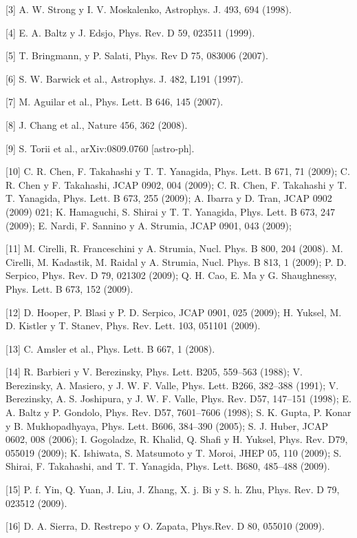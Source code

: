 [3] A. W. Strong y I. V. Moskalenko, Astrophys. J. 493, 694 (1998).

[4] E. A. Baltz y J. Edsjo, Phys. Rev. D 59, 023511 (1999).

[5] T. Bringmann, y P. Salati, Phys. Rev D 75, 083006 (2007).

[6] S. W. Barwick et al., Astrophys. J. 482, L191 (1997).

[7] M. Aguilar et al., Phys. Lett. B 646, 145 (2007).

[8] J. Chang et al., Nature 456, 362 (2008).

[9] S. Torii et al., arXiv:0809.0760 [astro-ph].

[10] C. R. Chen, F. Takahashi y T. T. Yanagida, Phys. Lett. B 671, 71 (2009); C. R. Chen y F. Takahashi, JCAP 0902, 004 (2009); 
C. R. Chen, F. Takahashi y T. T. Yanagida, Phys. Lett. B 673, 255 (2009); A. Ibarra y D. Tran, JCAP 0902 (2009) 021; 
K. Hamaguchi, S. Shirai y T. T. Yanagida, Phys. Lett. B 673, 247 (2009); E. Nardi, F. Sannino y A. Strumia, JCAP 0901, 043 (2009);

[11] M. Cirelli, R. Franceschini y A. Strumia, Nucl. Phys. B 800, 204 (2008). M. Cirelli, M. Kadastik, M. Raidal y A. Strumia, 
Nucl. Phys. B 813, 1 (2009); P. D. Serpico, Phys. Rev. D 79, 021302 (2009); Q. H. Cao, E. Ma y G. Shaughnessy, 
Phys. Lett. B 673, 152 (2009).

[12] D. Hooper, P. Blasi y P. D. Serpico, JCAP 0901, 025 (2009); H. Yuksel, M. D. Kistler y T. Stanev,
 Phys. Rev. Lett. 103, 051101 (2009).

[13] C. Amsler et al., Phys. Lett. B 667, 1 (2008).

[14] R. Barbieri y V. Berezinsky, Phys. Lett. B205, 559–563 (1988); V. Berezinsky, A. Masiero, y J. W. F. Valle, 
Phys. Lett. B266, 382–388 (1991); V. Berezinsky, A. S. Joshipura, y J. W. F. Valle, Phys. Rev. D57, 147–151 (1998); 
E. A. Baltz y P. Gondolo, Phys. Rev. D57, 7601–7606 (1998);  S. K. Gupta, P. Konar y B. Mukhopadhyaya, 
Phys. Lett. B606, 384–390 (2005); S. J. Huber, JCAP 0602, 008 (2006); I. Gogoladze, R. Khalid, Q. Shafi y H. Yuksel, 
Phys. Rev. D79, 055019 (2009); K. Ishiwata, S. Matsumoto y T. Moroi, JHEP 05, 110 (2009); S. Shirai, F. Takahashi, 
and T. T. Yanagida, Phys. Lett. B680, 485–488 (2009).

[15] P. f. Yin, Q. Yuan, J. Liu, J. Zhang, X. j. Bi y S. h. Zhu, Phys. Rev. D 79, 023512 (2009).

[16] D. A. Sierra, D. Restrepo y O. Zapata, Phys.Rev. D 80, 055010 (2009).

